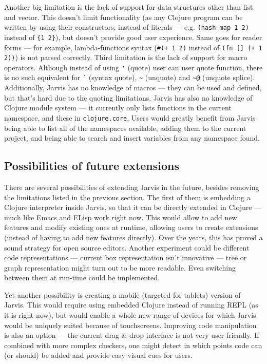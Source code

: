 \documentclass[11pt]{scrartcl}
\begin{document}
Another big limitation is the lack of support for data structures other than
list and vector.
This doesn’t limit functionality (as any Clojure program can be written by using
their constructors, instead of literals --- e.g. \lstinline|(hash-map 1 2)|
instead of \lstinline|{1 2}|),
but doesn’t provide good user experience.
Same goes for reader forms --- for example, lambda-functions syntax
(\lstinline|#(+ 1 2)|
instead of \lstinline|(fn [] (+ 1 2))|) is not parsed correctly.
Third limitation is the lack of support for macro operators.
Although instead of using \lstinline|'| (quote) user can user quote function, there is no
such equivalent for \lstinline|`| (syntax quote), \lstinline|~| (unquote) and
\lstinline|~@| (unquote splice).
Additionally, Jarvis has no knowledge of macros --- they can be used and defined,
but that’s hard due to the quoting limitations.
Jarvis has also no knowledge of Clojure module system --- it currently only lists
functions in the current namespace, and these in \lstinline|clojure.core|.
Users would greatly benefit from Jarvis being able to list all of the namespaces
available, adding them to the current project, and being able to search and
insert variables from any namespace found.


\subsection{Possibilities of future extensions}
There are several possibilities of extending Jarvis in the future, besides
removing the limitations listed in the previous section.
The first of them is embedding a Clojure interpreter inside Jarvis, so that it
can be directly extended in Clojure --- much like Emacs and ELisp work right now.
This would allow to add new features and modify existing ones at runtime,
allowing users to create extensions (instead of having to add new features
directly).
Over the years, this has proved a sound strategy for open source editors.
Another experiment could be different code representations --- current box
representation isn’t innovative --- tree or graph representation might turn out to
be more readable.
Even switching between them at run-time could be implemented.

Yet another possibility is creating a mobile (targeted for tablets) version of
Jarvis.
This would require using embedded Clojure instead of running REPL (as it is
right now), but would enable a whole new range of devices for which Jarvis would
be uniquely suited because of touchscreens.
Improving code manipulation is also an option --- the current drag \& drop
interface is not very user-friendly.
If combined with more complex checkers, one might detect in which points code
can (or should) be added and provide easy visual cues for users.
\end{document}
